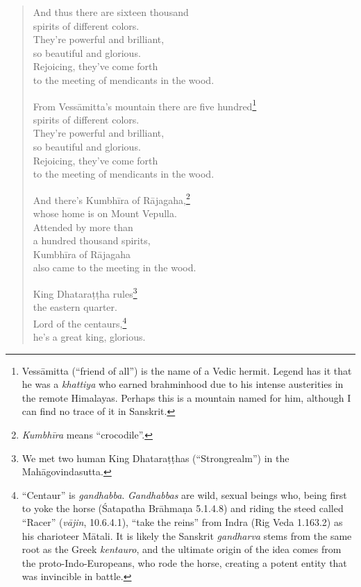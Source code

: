 \documentclass[12pt,openany]{book}%
\begin{document}
\begin{verse}
And thus there are sixteen thousand \\
spirits of different colors. \\
They’re powerful and brilliant, \\
so beautiful and glorious. \\
Rejoicing, they’ve come forth \\
to the meeting of mendicants in the wood. 

From \textsanskrit{Vessāmitta}’s mountain there are five hundred\footnote{\textsanskrit{Vessāmitta} (“friend of all”) is the name of a Vedic hermit. Legend has it that he was a \textit{khattiya} who earned brahminhood due to his intense austerities in the remote Himalayas. Perhaps this is a mountain named for him, although I can find no trace of it in Sanskrit. } \\
spirits of different colors. \\
They’re powerful and brilliant, \\
so beautiful and glorious. \\
Rejoicing, they’ve come forth \\
to the meeting of mendicants in the wood. 

And there’s \textsanskrit{Kumbhīra} of \textsanskrit{Rājagaha},\footnote{\textit{\textsanskrit{Kumbhīra}} means “crocodile”. } \\
whose home is on Mount Vepulla. \\
Attended by more than \\
a hundred thousand spirits, \\
\textsanskrit{Kumbhīra} of \textsanskrit{Rājagaha} \\
also came to the meeting in the wood. 

King \textsanskrit{Dhataraṭṭha} rules\footnote{We met two human King \textsanskrit{Dhataraṭṭhas} (“Strongrealm”) in the \textsanskrit{Mahāgovindasutta}. } \\
the eastern quarter. \\
Lord of the centaurs,\footnote{“Centaur” is \textit{gandhabba}. \textit{Gandhabbas} are wild, sexual beings who, being first to yoke the horse (Śatapatha \textsanskrit{Brāhmaṇa} 5.1.4.8) and riding the steed called “Racer” (\textit{\textsanskrit{vājin}}, 10.6.4.1), “take the reins” from Indra (Rig Veda 1.163.2) as his charioteer \textsanskrit{Mātali}. It is likely the Sanskrit \textit{gandharva} stems from the same root as the Greek \textit{kentauro}, and the ultimate origin of the idea comes from the proto-Indo-Europeans, who rode the horse, creating a potent entity that was invincible in battle. } \\
he’s a great king, glorious. 


\end{verse}
\end{document}
